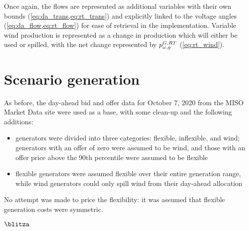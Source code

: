 \documentclass[11pt,a4paper]{article}
\numberwithin{equation}{section}
\begin{document}
Once again, the flows are represented as additional variables with their own bounds (\cref{eq:da_trans,eq:rt_trans}) and explicitly linked to the voltage angles (\cref{eq:da_flow,eq:rt_flow}) for ease of retrieval in the implementation.
Variable wind production is represented as a change in production which will either be used or spilled, with the net change represented by $p^{G,RT}_{\omega,g}$ (\cref{eq:rt_wind}).

\section{Scenario generation}
\label{sec:scenario}

As before, the day-ahead bid and offer data for October 7, 2020 from the MISO Market Data site \cite{MISOMarketData} were used as a base, with some clean-up and the following additions:
\begin{itemize}
\item generators were divided into three categories: flexible, inflexible, and wind; generators with an offer of zero were assumed to be wind, and those with an offer price above the 90th percentile were assumed to be flexible
\item flexible generators were assumed flexible over their entire generation range, while wind generators could only spill wind from their day-ahead allocation
\end{itemize}
No attempt was made to price the flexibility: it was assumed that flexible generation costs were symmetric.

$\blitza$

\cite{hodgeWindPowerForecasting2012}

\begin{table}[htbp]
    \centering

    \caption{Market clearing summary}
    \label{tab:summary}
\end{table}
\end{document}
